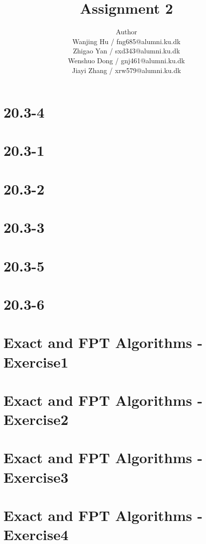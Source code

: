 \documentclass[12pt]{article}
\title{Assignment 2}
\author{Author \\
  Wanjing Hu / fng685@alumni.ku.dk  \\
  Zhigao Yan / sxd343@alumni.ku.dk  \\
  Wenshuo Dong / gnj461@alumni.ku.dk  \\
  Jiayi Zhang / xrw579@alumni.ku.dk \\
}
\begin{document}
\maketitle

\section{20.3-4}

\section{20.3-1}

\section{20.3-2}

\section{20.3-3}

\section{20.3-5}

\section{20.3-6}

\section{Exact and FPT Algorithms - Exercise1}

\section{Exact and FPT Algorithms - Exercise2}

\section{Exact and FPT Algorithms - Exercise3}

\section{Exact and FPT Algorithms - Exercise4}
\end{document}
